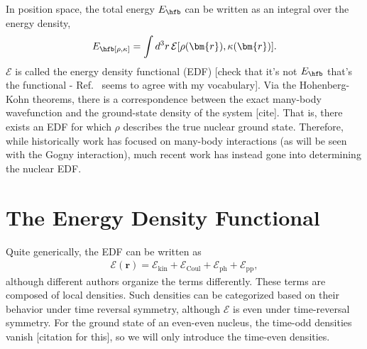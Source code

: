 \documentclass[../thesis.tex]{subfiles}
\begin{document}
In position space, the total energy $E_\hfb$ can be written as an integral over the energy density,
\begin{align}
	E_\hfb[\rho,\kappa]=\int d^3r\,\mathcal{E}[\rho(\bm{r}),\kappa(\bm{r})].
\end{align}
$\mathcal{E}$ is called the energy density functional (EDF) [check that it's not $E_\hfb$ that's the functional - Ref.~\cite{Bender2003} seems to agree with my vocabulary]. Via the Hohenberg-Kohn theorems, there is a correspondence between the exact many-body wavefunction and the ground-state density of the system [cite]. That is, there exists an EDF for which $\rho$ describes the true nuclear ground state. Therefore, while historically work has focused on many-body interactions (as will be seen with the Gogny interaction), much recent work has instead gone into determining the nuclear EDF.

\section{The Energy Density Functional}
Quite generically, the EDF can be written as
\begin{align}
	\mathcal{E}(\bm{r})=\mathcal{E}_\textrm{kin}+\mathcal{E}_\textrm{Coul}+\mathcal{E}_\textrm{ph}+\mathcal{E}_\textrm{pp},
\end{align}
although different authors organize the terms differently. These terms are composed of local densities. Such densities can be categorized based on their behavior under time reversal symmetry, although $\mathcal{E}$ is even under time-reversal symmetry. For the ground state of an even-even nucleus, the time-odd densities vanish [citation for this], so we will only introduce the time-even densities.
\end{document}
